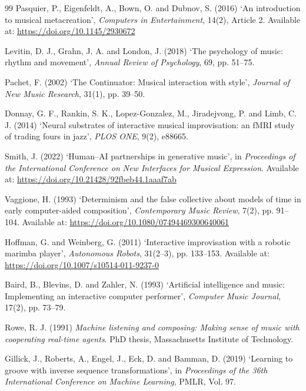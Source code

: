 \documentclass[11pt,a4paper]{article}
\begin{document}
\begin{thebibliography}{99}
Pasquier, P., Eigenfeldt, A., Bown, O. and Dubnov, S. (2016) 
`An introduction to musical metacreation', 
\textit{Computers in Entertainment}, 14(2), Article 2. 
Available at: \url{https://doi.org/10.1145/2930672}

Levitin, D. J., Grahn, J. A. and London, J. (2018) 
`The psychology of music: rhythm and movement', 
\textit{Annual Review of Psychology}, 69, pp. 51--75.

Pachet, F. (2002) 
`The Continuator: Musical interaction with style', 
\textit{Journal of New Music Research}, 31(1), pp. 39--50.

Donnay, G. F., Rankin, S. K., Lopez-Gonzalez, M., Jiradejvong, P. and Limb, C. J. (2014) 
`Neural substrates of interactive musical improvisation: an fMRI study of trading fours in jazz', 
\textit{PLOS ONE}, 9(2), e88665.

Smith, J. (2022) 
`Human--AI partnerships in generative music', 
in \textit{Proceedings of the International Conference on New Interfaces for Musical Expression}. 
Available at: \url{https://doi.org/10.21428/92fbeb44.1aaaf7ab}

Vaggione, H. (1993) 
`Determinism and the false collective about models of time in early computer-aided composition', 
\textit{Contemporary Music Review}, 7(2), pp. 91--104. 
Available at: \url{https://doi.org/10.1080/07494469300640061}

Hoffman, G. and Weinberg, G. (2011) 
`Interactive improvisation with a robotic marimba player', 
\textit{Autonomous Robots}, 31(2--3), pp. 133--153. 
Available at: \url{https://doi.org/10.1007/s10514-011-9237-0}

Baird, B., Blevins, D. and Zahler, N. (1993) 
`Artificial intelligence and music: Implementing an interactive computer performer', 
\textit{Computer Music Journal}, 17(2), pp. 73--79.

Rowe, R. J. (1991) 
\textit{Machine listening and composing: Making sense of music with cooperating real-time agents}. 
PhD thesis, Massachusetts Institute of Technology.

Gillick, J., Roberts, A., Engel, J., Eck, D. and Bamman, D. (2019) 
`Learning to groove with inverse sequence transformations', 
in \textit{Proceedings of the 36th International Conference on Machine Learning}, 
PMLR, Vol. 97.


\end{thebibliography}
\end{document}

